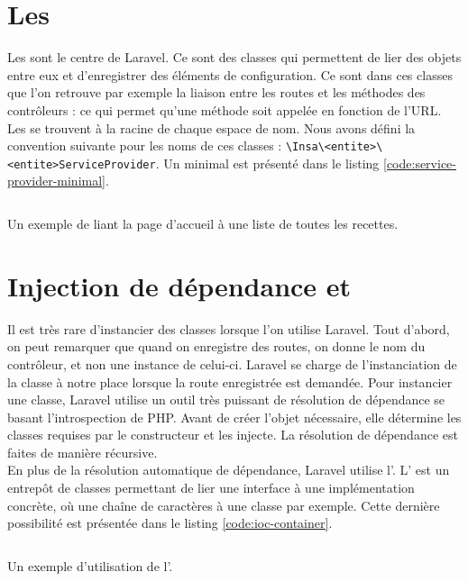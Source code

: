 \section{Les \servicesProvider{}}
	Les \servicesProvider{} sont le centre de Laravel. Ce sont des classes qui permettent de lier des objets entre eux et d'enregistrer des éléments de configuration. Ce sont dans ces classes que l'on retrouve par exemple la liaison entre les routes et les méthodes des contrôleurs : ce qui permet qu'une méthode soit appelée en fonction de l'URL.\\

	Les \servicesProvider{} se trouvent à la racine de chaque espace de nom. Nous avons défini la convention suivante pour les noms de ces classes : \verb|\Insa\<entite>\<entite>ServiceProvider|. Un \serviceProvider{} minimal est présenté dans le listing \ref{code:service-provider-minimal}.
	\begin{listing}[H]
		\inputminted{php}{code/serviceProvider.php}
		\caption{Un exemple de \serviceProvider{} liant la page d'accueil à une liste de toutes les recettes.}
		\label{code:service-provider-minimal}
	\end{listing}

\section{Injection de dépendance et \ioc{}}
\label{sec:ioc}
	Il est très rare d'instancier des classes lorsque l'on utilise Laravel. Tout d'abord, on peut remarquer que quand on enregistre des routes, on donne le nom du contrôleur, et non une instance de celui-ci. Laravel se charge de l'instanciation de la classe à notre place lorsque la route enregistrée est demandée. Pour instancier une classe, Laravel utilise un outil très puissant de résolution de dépendance se basant l'introspection de PHP. Avant de créer l'objet nécessaire, elle détermine les classes requises par le constructeur et les injecte. La résolution de dépendance est faites de manière récursive.\\

	En plus de la résolution automatique de dépendance, Laravel utilise l'\ioc{}. L'\ioc{} est un entrepôt de classes permettant de lier une interface à une implémentation concrète, où une chaîne de caractères à une classe par exemple. Cette dernière possibilité est présentée dans le listing \ref{code:ioc-container}.

	\begin{listing}[H]
		\inputminted{php}{code/iocContainer.php}
		\caption{Un exemple d'utilisation de l'\ioc{}.}
		\label{code:ioc-container}
	\end{listing}

